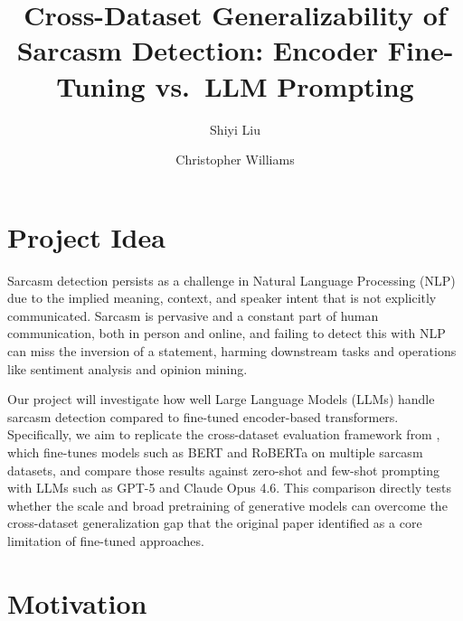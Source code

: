 \documentclass[sigconf, nonacm]{acmart}
\begin{document}
\title{Cross-Dataset Generalizability of Sarcasm Detection: Encoder Fine-Tuning vs.\ LLM Prompting}

\author{Shiyi Liu}

\author{Christopher Williams}

\renewcommand{\shortauthors}{Liu and Williams}

\maketitle

\section{Project Idea}

Sarcasm detection persists as a challenge in Natural Language Processing (NLP) due to the implied meaning, context, and speaker intent that is not explicitly communicated. Sarcasm is pervasive and a constant part of human communication, both in person and online, and failing to detect this with NLP can miss the inversion of a statement, harming downstream tasks and operations like sentiment analysis and opinion mining.

Our project will investigate how well Large Language Models (LLMs) handle sarcasm detection compared to fine-tuned encoder-based transformers. Specifically, we aim to replicate the cross-dataset evaluation framework from \cite{jang2024generalizablesarcasmdetectionjust}, which fine-tunes models such as BERT and RoBERTa on multiple sarcasm datasets, and compare those results against zero-shot and few-shot prompting with LLMs such as GPT-5 and Claude Opus 4.6. This comparison directly tests whether the scale and broad pretraining of generative models can overcome the cross-dataset generalization gap that the original paper identified as a core limitation of fine-tuned approaches.

\section{Motivation}
\end{document}

